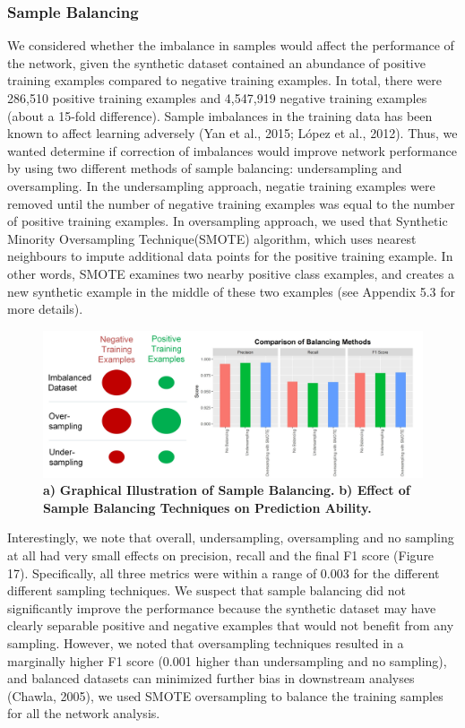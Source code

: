 \documentclass{article}
\begin{document}
\subsubsection{Sample Balancing}
We considered whether the imbalance in samples would affect the performance of the network, given the synthetic dataset contained an abundance of positive training examples compared to negative training examples. In total, there were 286,510 positive training examples and 4,547,919 negative training examples (about a 15-fold difference). Sample imbalances in the training data has been known to affect learning adversely (Yan et al., 2015; López et al., 2012). Thus, we wanted determine if correction of imbalances would improve network performance by using two different methods of sample balancing: undersampling and oversampling. In the undersampling approach, negatie training examples were removed until the number of negative training examples was equal to the number of positive training examples. In oversampling approach, we used that Synthetic Minority Oversampling Technique(SMOTE) algorithm, which uses nearest neighbours to impute additional data points for the positive training example. In other words, SMOTE examines two nearby positive class examples, and creates a new synthetic example in the middle of these two examples (see Appendix 5.3 for more details).
\begin{figure}[H]
\centering
\includegraphics[width=\textwidth]{comparisonofbalancingmethods.jpg}
\caption{\textbf{a)} \textbf{Graphical Illustration of Sample Balancing.} \textbf{b) Effect of Sample Balancing Techniques on Prediction Ability.}}
\end{figure}
Interestingly, we note that overall, undersampling, oversampling and no sampling at all had very small effects on precision, recall and the final F1 score (Figure 17). Specifically, all three metrics were within a range of 0.003 for the different different sampling techniques. We suspect that sample balancing did not significantly improve the performance because the synthetic dataset may have clearly separable positive and negative examples that would not benefit from any sampling.
However, we noted that oversampling techniques resulted in a marginally higher F1 score (0.001 higher than undersampling and no sampling), and balanced datasets can minimized further bias in downstream analyses (Chawla, 2005), we used SMOTE oversampling to balance the training samples for all the network analysis.
\end{document}
